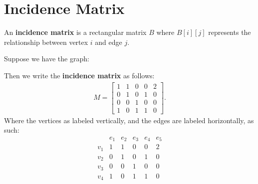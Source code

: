 \documentclass{report}
\begin{document}
    \section{\LARGE Incidence Matrix}
    \smallbreak \noindent
    \begin{definition}
        \item An \textbf{incidence matrix} is a rectangular matrix \( B \) where \( B[i][j] \) represents the relationship between vertex \( i \) and edge \( j \).

    \end{definition}
    \bigbreak \noindent 
    Suppose we have the graph:
    \bigbreak \noindent 
    \begin{minipage}[]{0.47\textwidth}
    \end{minipage}
    \begin{minipage}[]{0.47\textwidth}
       Then we write the \textbf{incidence matrix} as follows:
       \begin{align*}
          M = \begin{bmatrix}
               1 & 1 & 0 & 0 & 2 \\
               0 & 1 & 0 & 1 & 0 \\
               0 & 0 & 1 & 0 & 0  \\
               1 & 0 & 1 & 1 & 0 
           \end{bmatrix}
       .\end{align*}
       Where the vertices as labeled vertically, and the edges are labeled horizontally, as such:
       \bigbreak \noindent 
        \[
        \begin{array}{c|ccccc}
            & e_{1} & e_{2} & e_{3} & e_{4} & e_{5} \\
        \hline
            v_{1} & 1 & 1 & 0 & 0 & 2 \\
            v_{2} & 0 & 1 & 0 & 1 & 0 \\
            v_{3} & 0 & 0 & 1 & 0 & 0  \\
            v_{4} & 1 & 0 & 1 & 1 & 0 
        \end{array}
        \]
    \end{minipage}

    \pagebreak \bigbreak \noindent 
\end{document}
